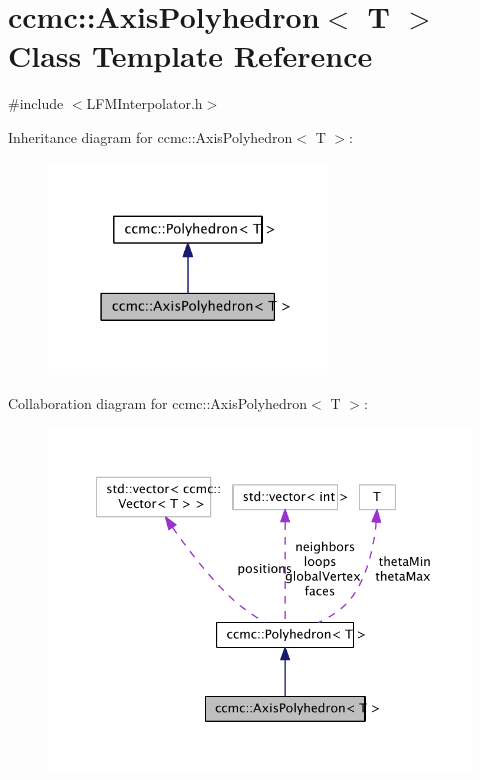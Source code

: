 \hypertarget{classccmc_1_1_axis_polyhedron}{\section{ccmc\-:\-:Axis\-Polyhedron$<$ T $>$ Class Template Reference}
\label{classccmc_1_1_axis_polyhedron}
}


{\ttfamily \#include $<$L\-F\-M\-Interpolator.\-h$>$}



Inheritance diagram for ccmc\-:\-:Axis\-Polyhedron$<$ T $>$\-:\nopagebreak
\begin{figure}[H]
\begin{center}
\leavevmode
\includegraphics[width=210pt]{classccmc_1_1_axis_polyhedron__inherit__graph}
\end{center}
\end{figure}


Collaboration diagram for ccmc\-:\-:Axis\-Polyhedron$<$ T $>$\-:\nopagebreak
\begin{figure}[H]
\begin{center}
\leavevmode
\includegraphics[width=345pt]{classccmc_1_1_axis_polyhedron__coll__graph}
\end{center}
\end{figure}
